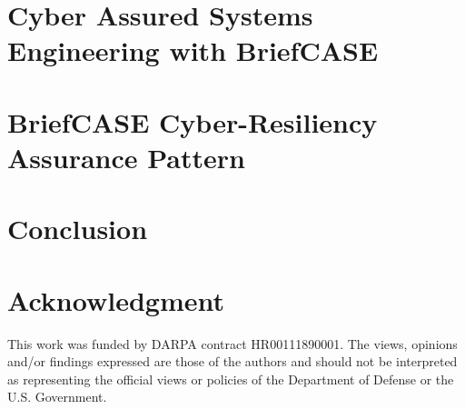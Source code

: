 \documentclass[runningheads]{llncs}
\begin{document}
\section{Cyber Assured Systems Engineering with BriefCASE}
\label{sec:briefcase}


\section{BriefCASE Cyber-Resiliency Assurance Pattern}
\label{sec:assurance-pattern}


\section{Conclusion}
\label{sec:conclusion}


\section{Acknowledgment}

This work was funded by DARPA contract HR00111890001. The views, opinions and/or findings expressed are those of the authors and should not be interpreted as representing the official views or policies of the Department of Defense or the U.S. Government.



\end{document}
